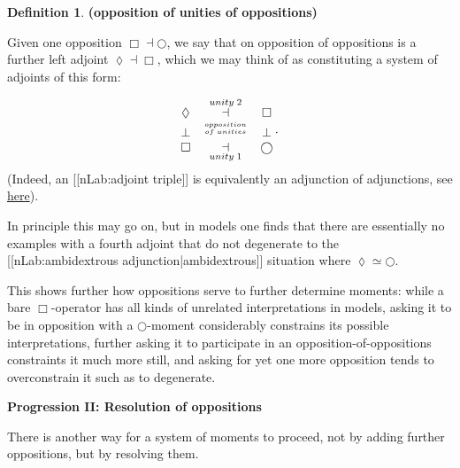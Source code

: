 \documentclass[12pt,titlepage]{article}
\newcommand{\itexarray}[1]{\begin{matrix}#1\end{matrix}}
\theoremstyle{plain}
\theoremstyle{definition}
\newtheorem{defn}{Definition}
\theoremstyle{remark}
\begin{document}
\begin{defn}
\label{HigherOrderOpposition}\hypertarget{HigherOrderOpposition}{}
\textbf{(opposition of unities of oppositions)}

Given one opposition $\Box \dashv \bigcirc$, we say that on opposition of oppositions is a further left adjoint $\lozenge \dashv \Box$, which we may think of as constituting a system of adjoints of this form:

\begin{displaymath}
\itexarray{
    \lozenge &\overset{unity\;2}{\dashv}& \Box
    \\
    \bot &\stackrel{opposition \atop {of\;unities}}{}& \bot
    \\
    \Box &\underset{unity\;1}{\dashv}& \bigcirc
  }
  \,.
\end{displaymath}
(Indeed, an [[nLab:adjoint triple]] is equivalently an adjunction of adjunctions, see \href{http://ncatlab.org/nlab/show/adjoint+triple#AsAdjunctionOfAdjunctions}{here}).

\end{defn}
In principle this may go on, but in models one finds that there are essentially no examples with a fourth adjoint that do not degenerate to the [[nLab:ambidextrous adjunction|ambidextrous]] situation where $\lozenge \simeq \bigcirc$.

This shows further how oppositions serve to further determine moments: while a bare $\Box$-operator has all kinds of unrelated interpretations in models, asking it to be in opposition with a $\bigcirc$-moment considerably constrains its possible interpretations, further asking it to participate in an opposition-of-oppositions constraints it much more still, and asking for yet one more opposition tends to overconstrain it such as to degenerate.

\textbf{Progression II: Resolution of oppositions}

There is another way for a system of moments to proceed, not by adding further oppositions, but by resolving them.
\end{document}
